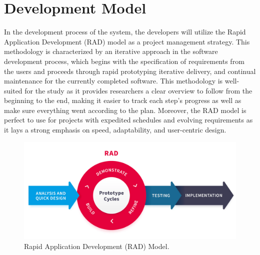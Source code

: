 
\section{Development Model}
In the development process of the system, the developers will utilize the Rapid Application Development (RAD) model as a project management strategy. This methodology is characterized by an iterative approach in the software development process, which begins with the specification of requirements from the users and proceeds through rapid prototyping iterative delivery, and continual maintenance for the currently completed software. This methodology is well-suited for the study as it provides researchers a clear overview to follow from the beginning to the end, making it easier to track each step's progress as well as make sure everything went according to the plan. Moreover, the RAD model is perfect to use for projects with expedited schedules and evolving requirements as it lays a strong emphasis on speed, adaptability, and user-centric design.

\begin{figure}[H]
    \centering
    \includegraphics[width=1\linewidth]{figures/images/rad.png}
    \caption{Rapid Application Development (RAD) Model.}
    \label{fig:rad}
\end{figure}
    
